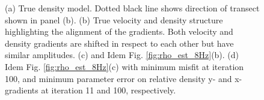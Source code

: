 \documentclass{article}
\begin{document}
\begin{figure}[H]
\begin{subfigure}[c]{0.7\linewidth}
				\end{subfigure}
				\begin{subfigure}[c]{0.67\linewidth}
					\centering
				\end{subfigure}
				\caption{(a) True density model. Dotted black line shows direction of transect shown in panel (b). (b) True velocity and density structure highlighting the alignment of the gradients. Both velocity and density gradients are shifted in respect to each other but have similar amplitudes. (c) and Idem Fig. \ref{fig:rho_est_8Hz}(b). (d) Idem Fig. \ref{fig:rho_est_8Hz}(c) with minimum misfit at iteration 100, and minimum parameter error on relative density y- and x-gradients at iteration 11 and 100, respectively.}
				\label{fig:APP_mod_par2}
			\end{figure}%
		
\end{document}
